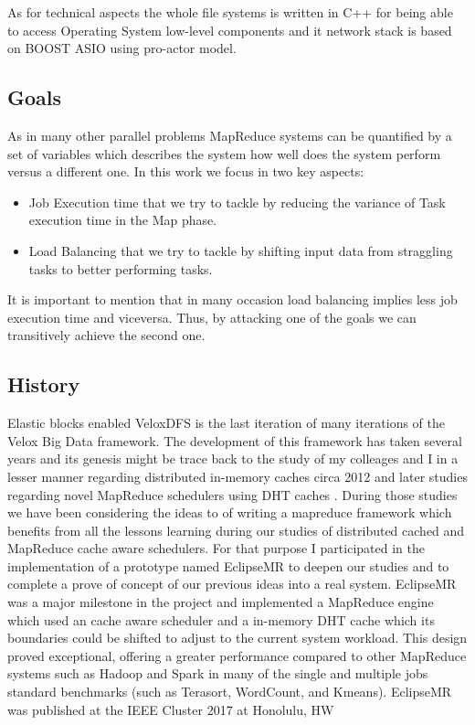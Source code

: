 As for technical aspects the whole file systems is written in C++ for being
able to access Operating System low-level components and it network stack is
based on BOOST ASIO using pro-actor model.

\subsection{Goals} 

As in many other parallel problems MapReduce systems can be quantified by a set of 
variables which describes the system how well does the system perform versus a different one. 
In this work we focus in two key aspects: 

\begin{itemize}
    \item {Job Execution time} that we try to tackle by reducing the variance of Task execution time in the Map phase.
    \item {Load Balancing} that we try to tackle by shifting input data from straggling tasks to better performing tasks. 
\end{itemize}

It is important to mention that in many occasion load balancing implies less job execution time and viceversa. Thus, by attacking one of the goals we can transitively achieve the second one.

\subsection{History}
Elastic blocks enabled VeloxDFS is the last iteration of many iterations of the Velox Big Data framework. The development of this framework has taken several years and its genesis might be trace back to the study of my  colleages and I in a lesser manner regarding distributed in-memory caches circa 2012 \cite{nam2012high} and later studies regarding novel MapReduce schedulers using DHT caches \cite{eom2015kde}. During those studies we have been considering the ideas to of writing a mapreduce framework which benefits from all the lessons learning during our studies of distributed cached and MapReduce cache aware schedulers. For that purpose I participated in the implementation of a prototype named EclipseMR \cite{sanchez2017eclipsemr} to deepen our studies and to complete a prove of concept of our previous ideas into a real system. EclipseMR was a major milestone in the project and implemented a MapReduce engine which used an cache aware scheduler and a in-memory DHT cache which its boundaries could be shifted to adjust to the current system workload. This design proved exceptional, offering a greater performance compared to other MapReduce systems such as Hadoop and Spark in many of the single and multiple jobs standard benchmarks (such as Terasort, WordCount, and Kmeans). EclipseMR was published at the IEEE Cluster 2017 at Honolulu, HW\cite{sanchez2017eclipsemr}\\

